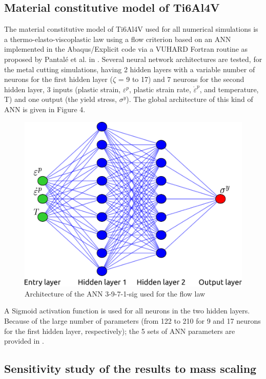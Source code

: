 \documentclass[final,5p,times,twocolumn]{elsarticle}
\begin{document}
\subsection{Material constitutive model of Ti6Al4V}

The material constitutive model of Ti6Al4V used for all numerical simulations is a thermo-elasto-viscoplastic law using a flow criterion based on an ANN implemented in the Abaqus/Explicit code via a VUHARD Fortran routine as proposed by Pantalé et al. in \cite{pantale_efficient_2022}. Several neural network architectures are tested, for the metal cutting simulations, having 2 hidden layers with a variable number of neurons for the first hidden layer ($\zeta$ = 9 to 17) and 7 neurons for the second hidden layer, 3 inputs (plastic strain, $\varepsilon^p$, plastic strain rate, ${\dot{\varepsilon}}^p$, and temperature, T) and one output (the yield stress, $\sigma^y$). The global architecture of this kind of ANN is given in Figure 4.

\begin{figure}[h]
\centering
\includegraphics[width=0.8\columnwidth]{Figures/ANN}
\caption{Architecture of the ANN 3-9-7-1-sig used for the flow law}
\label{ANN}
\end{figure}

A Sigmoid activation function is used for all neurons in the two hidden layers. Because of the large number of parameters (from 122 to 210 for 9 and 17 neurons for the first hidden layer, respectively); the 5 sets of ANN parameters are provided in \cite{pantale_coefficients_2022}.

\subsection{Sensitivity study of the results to mass scaling}
\end{document}
